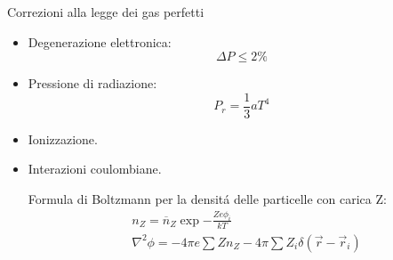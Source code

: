 \begin{frame}{Correzioni alla legge dei gas perfetti}

\begin{itemize}
\item Degenerazione elettronica: \[\Delta P\leq2\%\]

\item Pressione di radiazione: \[P_r=\frac{1}{3}aT^4\]

\item Ionizzazione.

\item Interazioni coulombiane. 

Formula di Boltzmann per la densit\'a delle particelle con carica Z:
\begin{align}
&n_Z=\overline{n}_Z\exp{-\frac{Ze\phi_i}{kT}}\\
&\nabla^2\phi=-4\pi e\sum Zn_Z-4\pi\sum Z_i\delta(\vec{r}-\vec{r}_i)\label{eq:poissonscreened}
\end{align}

\end{itemize}

\end{frame}

